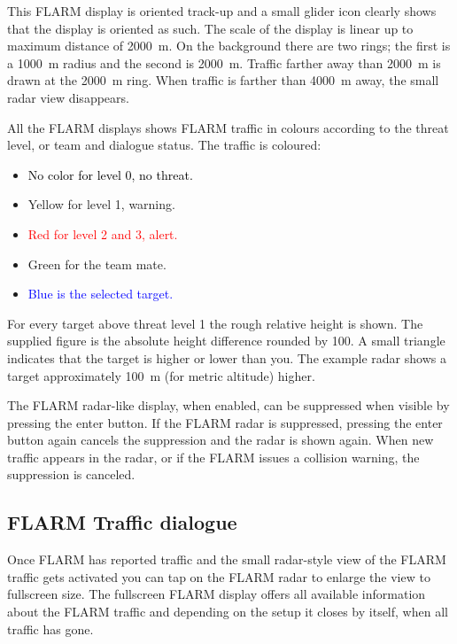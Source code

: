 This FLARM display is oriented track-up and a small glider icon
clearly shows that the display is oriented as such.  The scale of the
display is linear up to maximum distance of 2000~m.  On the
background there are two rings; the first is a 1000~m radius and the second
is 2000~m.  Traffic farther away than 2000~m is drawn at the 2000~m ring.
When traffic is farther than 4000~m away, the small radar view disappears.

All the FLARM displays shows FLARM traffic in colours according to
the threat level, or team and dialogue status.  The traffic is coloured:
\begin{itemize}
\item \textcolor{black} {No color for level 0, no threat.} 
\item \textcolor{warning} { Yellow for level 1, warning.}
\item \textcolor{red} {Red for level 2 and 3, alert.}
\item \textcolor{teammate} {Green for the team mate.}
\item \textcolor{blue} {Blue is the selected target.}
\end{itemize}

For every target above threat level 1 the rough relative height is shown. The
supplied figure is the absolute height difference rounded by 100.  A small
triangle indicates that the target is higher or lower than you.  The example
radar shows a target approximately 100~m (for metric altitude) higher.

The FLARM radar-like display, when enabled, can be suppressed when
visible by pressing the enter button.  If the
FLARM radar is suppressed, pressing the enter button again cancels the
suppression and the radar is shown again.  When new traffic appears in
the radar, or if the FLARM issues a collision warning, the suppression
is canceled.


\subsection*{FLARM Traffic dialogue}\label{sec:flarm-traffic}

Once FLARM has reported traffic and the small radar-style view of the FLARM
traffic gets activated   you can tap on the FLARM radar to
enlarge the view to fullscreen size.  
The fullscreen FLARM display offers all available information
about the FLARM traffic and depending on the setup it closes by itself, when all
traffic has gone.

